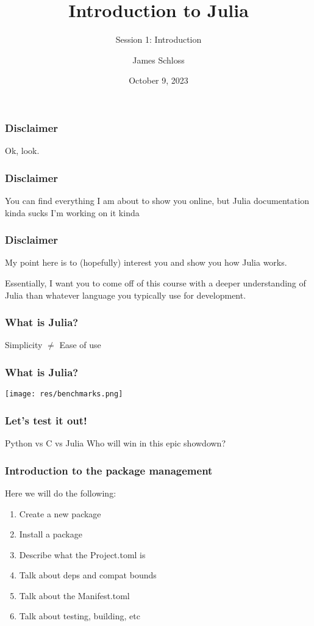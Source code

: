 \documentclass{beamer}
\title[Intro.jl]{Introduction to Julia} %
\subtitle{Session 1: Introduction}
\author{James Schloss} %
\institute[LeiosLabs] %
{
\textit{jrs.schloss@gmail.com} %
}
\date{October 9, 2023} %
\begin{document}
\begin{frame}
\vspace*{1.4cm}
\titlepage %
\end{frame}


\begin{frame}
\frametitle{Disclaimer}
\center \Huge{Ok, look.}
\end{frame}

\begin{frame}
\frametitle{Disclaimer}
\center \Huge{You can find everything I am about to show you online, but Julia documentation kinda sucks}
\center \small{I'm working on it kinda}
\end{frame}

\begin{frame}
\frametitle{Disclaimer}

\center My point here is to (hopefully) interest you and show you how Julia works.

\pause
\center Essentially, I want you to come off of this course with a deeper understanding of Julia than whatever language you typically use for development.
\end{frame}

\begin{frame}
\frametitle{What is Julia?}

\pause
\center \Huge{Simplicity $\neq$ Ease of use}

\end{frame}

\begin{frame}
\frametitle{What is Julia?}
\texttt{[image: res/benchmarks.png]}
\end{frame}

\begin{frame}
\frametitle{Let's test it out!}

\center \Huge{Python vs C vs Julia}
\center \small{Who will win in this epic showdown?}
\end{frame}

\begin{frame}
\frametitle{Introduction to the package management}
Here we will do the following:
\begin{enumerate}
\item Create a new package
\item Install a package
\item Describe what the Project.toml is
\item Talk about deps and compat bounds
\item Talk about the Manifest.toml
\item Talk about testing, building, etc
\end{enumerate}
\end{frame}
\end{document}
